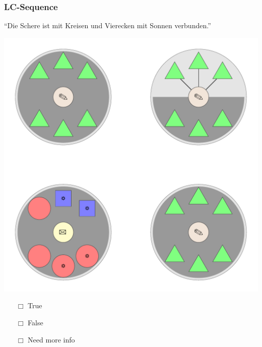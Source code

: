 \documentclass[fleqn,10pt,serif,xcolor=dvipsnames]{beamer}
\newcommand{\LC}{LC\xspace}
\newcommand{\mymark}[1]{{\color{blue}{#1}}}
\begin{document}
\begin{frame}
  \frametitle{\LC-Sequence}
  \begin{center}
    ``Die Schere ist mit Kreisen und Vierecken mit Sonnen verbunden.''

    \vspace{0.1cm}

    \includegraphics[width=0.5 \textwidth]{../../pictures/lc_01_2.pdf}

    \vspace{0.1cm}

    \begin{multicols}{3}
      \begin{itemize} 
      \item[$\Box$] True\\
        \onslide<2>{$\leadsto$  \mymark{false}}
      \item[$\Box$] False\\
        \onslide<2>{$\leadsto$ \mymark{false}}
      \item[$\Box$] Need more info 
      \end{itemize}
    \end{multicols}

  \end{center}
\end{frame}
\end{document}
